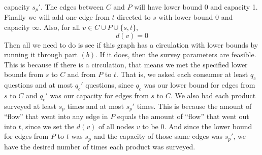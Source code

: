 \documentclass{article}
\begin{document}
\begin{description}
        capacity $s_p'$. The edges between $C$ and $P$ will have lower bound 0
        and capacity 1. Finally we will add one edge from $t$ directed to $s$ with lower
        bound 0 and capacity $\infty$. Also, for all $v \in C \cup P \cup
        \{s,t\}$,
        \[ d(v) = 0 \]
        Then all we need to do is see if this
        graph has a circulation with lower bounds by running it through part $(b)$. If it does,
        then the survey parameters are feasible. This is because if there is a
        circulation, that means we met the specified lower bounds from $s$ to
        $C$ and from $P$ to $t$. That is, we asked each consumer at least $q_c$
        questions and at most $q_c'$ questions, since $q_c$ was our lower bound
        for edges from $s$ to $C$ and $q_c'$ was our capacity for edges from $s$ to $C$.
        We also had each product surveyed at least
        $s_p$ times and at most $s_p'$ times. This is because the amount of
        ``flow'' that went into any edge in $P$ equals the amount of ``flow'' that
        went out into $t$, since we set the $d(v)$ of all nodes $v$ to be 0. And
        since the lower bound for edges from $P$ to $t$ was $s_p$ and the
        capacity of those same edges was $s_p'$, we have the desired number of
        times each product was surveyed.
\end{description}
\newpage
\end{document}
